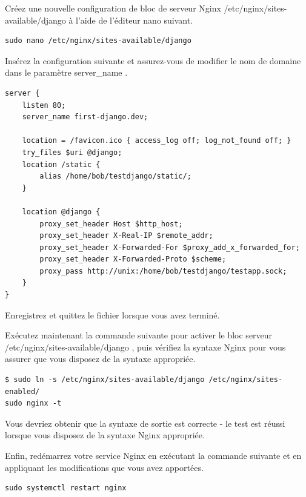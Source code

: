 \documentclass{article}
\begin{document}
Créez une nouvelle configuration de bloc de serveur Nginx /etc/nginx/sites-available/django à l'aide de l'éditeur nano suivant.
\begin{verbatim}
sudo nano /etc/nginx/sites-available/django
\end{verbatim}

Insérez la configuration suivante et assurez-vous de modifier le nom de domaine dans le paramètre server\_name .

\begin{verbatim}
server {
    listen 80;
    server_name first-django.dev;

    location = /favicon.ico { access_log off; log_not_found off; }
    try_files $uri @django;
    location /static {
        alias /home/bob/testdjango/static/;
    }

    location @django {
        proxy_set_header Host $http_host;
        proxy_set_header X-Real-IP $remote_addr;
        proxy_set_header X-Forwarded-For $proxy_add_x_forwarded_for;
        proxy_set_header X-Forwarded-Proto $scheme;
        proxy_pass http://unix:/home/bob/testdjango/testapp.sock;
    }
}
\end{verbatim}

Enregistrez et quittez le fichier lorsque vous avez terminé.

Exécutez maintenant la commande suivante pour activer le bloc serveur /etc/nginx/sites-available/django , puis vérifiez la syntaxe Nginx pour vous assurer que vous disposez de la syntaxe appropriée.

\begin{verbatim}
$ sudo ln -s /etc/nginx/sites-available/django /etc/nginx/sites-enabled/
sudo nginx -t
\end{verbatim}

Vous devriez obtenir que la syntaxe de sortie est correcte - le test est réussi lorsque vous disposez de la syntaxe Nginx appropriée.

Enfin, redémarrez votre service Nginx en exécutant la commande suivante et en appliquant les modifications que vous avez apportées.

\begin{verbatim}
sudo systemctl restart nginx
\end{verbatim}
\end{document}
